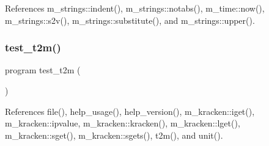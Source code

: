 References m\+\_\+strings\+::indent(), m\+\_\+strings\+::notabs(), m\+\_\+time\+::now(), m\+\_\+strings\+::s2v(), m\+\_\+strings\+::substitute(), and m\+\_\+strings\+::upper().

\mbox{\label{t2m_8f90_a1d0ef3619e5da531507fb99db2ebb4fe}} 
\subsubsection{\texorpdfstring{test\+\_\+t2m()}{test\_t2m()}}
{\footnotesize\ttfamily program test\+\_\+t2m (\begin{DoxyParamCaption}{ }\end{DoxyParamCaption})}



References file(), help\+\_\+usage(), help\+\_\+version(), m\+\_\+kracken\+::iget(), m\+\_\+kracken\+::ipvalue, m\+\_\+kracken\+::kracken(), m\+\_\+kracken\+::lget(), m\+\_\+kracken\+::sget(), m\+\_\+kracken\+::sgets(), t2m(), and unit().

